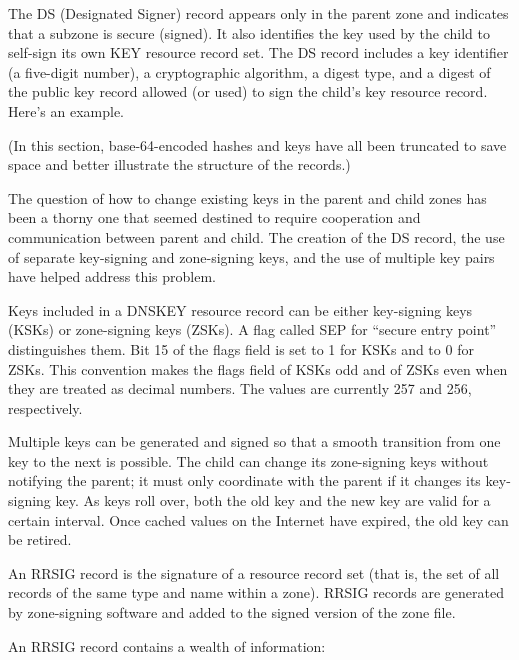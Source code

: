 The DS (Designated Signer) record appears only in the parent zone and
indicates that a subzone is secure (signed). It also identifies the key
used by the child to self-sign its own KEY resource record set. The DS
record includes a key identifier (a five-digit number), a cryptographic
algorithm, a digest type, and a digest of the public key record allowed
(or used) to sign the child's key resource record. Here's an example.


(In this section, base-64-encoded hashes and keys have all been
truncated to save space and better illustrate the structure of the
records.)

The question of how to change existing keys in the parent and child
zones has been a thorny one that seemed destined to require cooperation
and communication between parent and child. The creation of the DS
record, the use of separate key-signing and zone-signing keys, and the
use of multiple key pairs have helped address this problem.

Keys included in a DNSKEY resource record can be either key-signing keys
(KSKs) or zone-signing keys (ZSKs). A flag called SEP for ``secure entry
point'' distinguishes them. Bit 15 of the flags field is set to 1 for
KSKs and to 0 for ZSKs. This convention makes the flags field of KSKs
odd and of ZSKs even when they are treated as decimal numbers. The
values are currently 257 and 256, respectively.

Multiple keys can be generated and signed so that a smooth transition
from one key to the next is possible. The child can change its
zone-signing keys without notifying the parent; it must only coordinate
with the parent if it changes its key-signing key. As keys roll over,
both the old key and the new key are valid for a certain interval. Once
cached values on the Internet have expired, the old key can be retired.

An RRSIG record is the signature of a resource record set (that is, the
set of all records of the same type and name within a zone). RRSIG
records are generated by zone-signing software and added to the signed
version of the zone file.

An RRSIG record contains a wealth of information:

